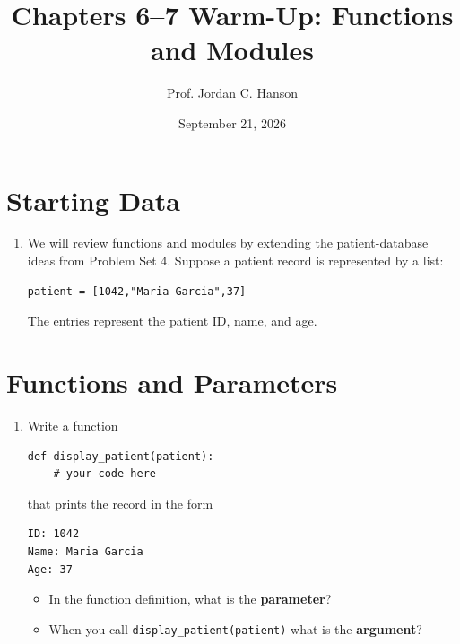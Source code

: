 \documentclass{article}
\begin{document}
\twocolumn

\title{Chapters 6--7 Warm-Up: Functions and Modules}
\author{Prof. Jordan C. Hanson}
\date{September 21, 2026}

\maketitle

\section{Starting Data}

\begin{enumerate}

\item We will review functions and modules by extending the
patient-database ideas from Problem Set 4.  Suppose a patient record is represented by a list:

\begin{verbatim}
patient = [1042,"Maria Garcia",37]
\end{verbatim}

The entries represent the patient ID, name, and age.

\end{enumerate}

\section{Functions and Parameters}

\begin{enumerate}

\item Write a function

\begin{verbatim}
def display_patient(patient):
    # your code here
\end{verbatim}

that prints the record in the form

\begin{verbatim}
ID: 1042
Name: Maria Garcia
Age: 37
\end{verbatim}

\begin{itemize}

\item In the function definition, what is the
\textbf{parameter}?

\item When you call \verb+display_patient(patient)+ what is the \textbf{argument}?

\end{itemize}

\end{enumerate}
\end{document}
